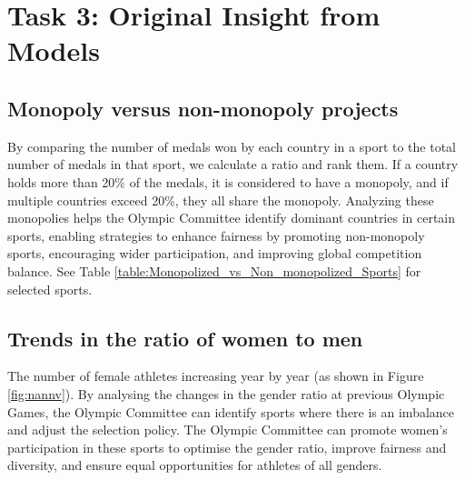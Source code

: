\documentclass{mcmthesis}
\begin{document}
\section{Task 3: Original Insight from Models} 
\subsection{Monopoly versus non-monopoly projects}

By comparing the number of medals won by each country in a sport to the total number of medals in that sport, we calculate a ratio and rank them. If a country holds more than 20\% of the medals, it is considered to have a monopoly, and if multiple countries exceed 20\%, they all share the monopoly. Analyzing these monopolies helps the Olympic Committee identify dominant countries in certain sports, enabling strategies to enhance fairness by promoting non-monopoly sports, encouraging wider participation, and improving global competition balance. See Table \ref{table:Monopolized_vs_Non_monopolized_Sports} for selected sports.

\begin{table}[H]
	\centering
	\caption{Monopolized vs Non-monopolized Sports}
	\label{table:Monopolized_vs_Non_monopolized_Sports}
\end{table}

\subsection{Trends in the ratio of women to men}

  The number of female athletes increasing year by year (as shown in Figure \ref{fig:nannv}). By analysing the changes in the gender ratio at previous Olympic Games, the Olympic Committee can identify sports where there is an imbalance and adjust the selection policy. The Olympic Committee can promote women's participation in these sports to optimise the gender ratio, improve fairness and diversity, and ensure equal opportunities for athletes of all genders.
\end{document}
